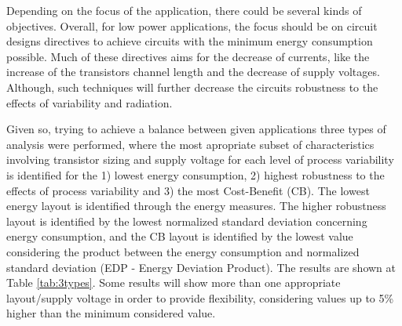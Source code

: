 \documentclass[pgmicro,mestrado,english]{iiufrgs}
\begin{document}





	Depending on the focus of the application, there could be several kinds of objectives. Overall, for low power applications, the focus should be on circuit designs directives to achieve circuits with the minimum energy consumption possible. Much of these directives aims for the decrease of currents, like the increase of the transistors channel length and the decrease of supply voltages. Although, such techniques will further decrease the circuits robustness to the effects of variability and radiation.

Given so, trying to achieve a balance between given applications three types of analysis were performed, where the most apropriate subset of characteristics involving transistor sizing and supply voltage for each level of process variability is identified for the 1) lowest energy consumption, 2) highest robustness to the effects of process variability and 3) the most Cost-Benefit (CB). The lowest energy layout is identified through the energy measures. The higher robustness layout is identified by the lowest normalized standard deviation concerning energy consumption, and the CB layout is identified by the lowest value considering the product between the energy consumption and normalized standard deviation (EDP - Energy Deviation Product). The results are shown at Table \ref{tab:3types}. Some results will show more than one appropriate layout/supply voltage in order to provide flexibility, considering values up to 5\% higher than the minimum considered value.
\end{document}
